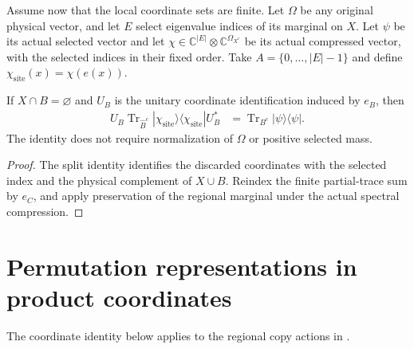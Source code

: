 \begin{theorem}
\label{thm:compressed_site_actual_regional_marginal}
\leanok
{}
Assume now that the local coordinate sets are finite. Let $\Omega$ be
any original physical vector, and let $E$ select eigenvalue indices of its
marginal on $X$. Let $\psi$ be its actual selected vector and let
$\chi\in\mathbb C^{|E|}\otimes\mathbb C^{\Omega_{X^c}}$ be its
actual compressed vector, with the selected indices in their fixed order.
Take $A=\{0,\ldots,|E|-1\}$ and define
$\chi_{\mathrm{site}}(x)=\chi(e(x))$.

If $X\cap B=\varnothing$ and $U_B$ is the unitary coordinate
identification induced by $e_B$, then
\begin{align}
 U_B\operatorname{Tr}_{\widehat B^c}
   |\chi_{\mathrm{site}}\rangle\langle\chi_{\mathrm{site}}|U_B^*
 &=\operatorname{Tr}_{B^c}|\psi\rangle\langle\psi|.
\end{align}
The identity does not require normalization of $\Omega$ or positive
selected mass.
\end{theorem}
\begin{proof}
\leanok
The split identity identifies the discarded coordinates with the selected
index and the physical complement of $X\cup B$. Reindex the finite
partial-trace sum by $e_C$, and apply preservation of the regional marginal
under the actual spectral compression.
\end{proof}

\section{Permutation representations in product coordinates}
\label{sec:group_algebra_product_coordinates}

The coordinate identity below applies to the regional copy actions in
\cite[Section~5, lines~14--27 and 73--80]{OpenAI2026AreaLaw}.

